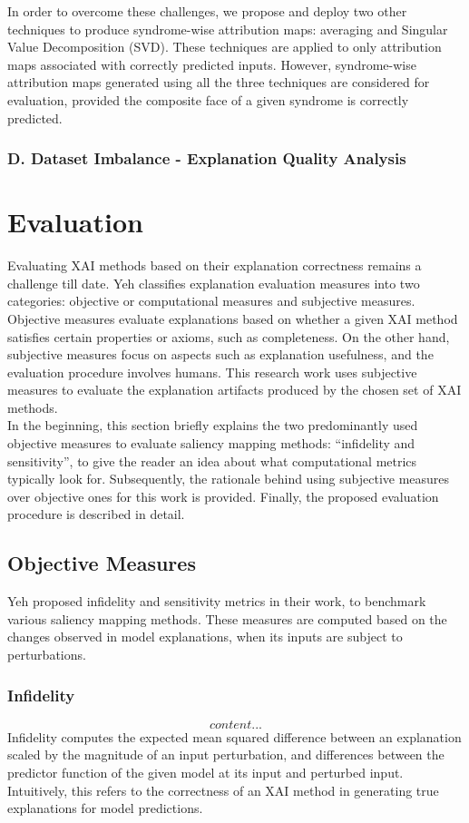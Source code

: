 \documentclass[../report.tex]{subfiles}
\begin{document}
    In order to overcome these challenges, we propose and deploy two other techniques to produce syndrome-wise attribution maps: averaging and Singular Value Decomposition (SVD). These techniques are applied to only attribution maps associated with correctly predicted inputs. However, syndrome-wise attribution maps generated using all the three techniques are considered for evaluation, provided the composite face of a given syndrome is correctly predicted.
    \subsubsection{D. Dataset Imbalance - Explanation Quality Analysis} \label{sec_data_imb}
    	\section{Evaluation}\label{sec_evaluation}
    Evaluating XAI methods based on their explanation correctness remains a challenge till date. Yeh \etal \cite{yeh2019fidelity} classifies explanation evaluation measures into two categories: objective or computational measures and subjective measures. Objective measures evaluate explanations based on whether a given XAI method satisfies certain properties or axioms, such as completeness\cite{sundararajan2017axiomatic}. On the other hand, subjective measures focus on aspects such as explanation usefulness, and the evaluation procedure involves humans. This research work uses subjective measures to evaluate the explanation artifacts produced by the chosen set of XAI methods.\\ 
    In the beginning, this section briefly explains the two predominantly used objective measures to evaluate saliency mapping methods: \enquote{infidelity and sensitivity}\cite{yeh2019fidelity}, to give the reader an idea about what computational metrics typically look for. Subsequently, the rationale behind using subjective measures over objective ones for this work is provided. Finally, the proposed evaluation procedure is described in detail.
    \subsection{Objective Measures}
    Yeh \etal \cite{yeh2019fidelity} proposed infidelity and sensitivity metrics in their work, to benchmark various saliency mapping methods. These measures are computed based on the changes observed in model explanations, when its inputs are subject to perturbations. 
    \subsubsection{Infidelity}
    \begin{equation}
    	content...
    \end{equation}
    Infidelity computes the expected mean squared difference between an explanation scaled by the magnitude of an input perturbation, and differences between the predictor function of the given model at its input and perturbed input. Intuitively, this refers to the correctness of an XAI method in generating true explanations for model predictions.
\end{document}
